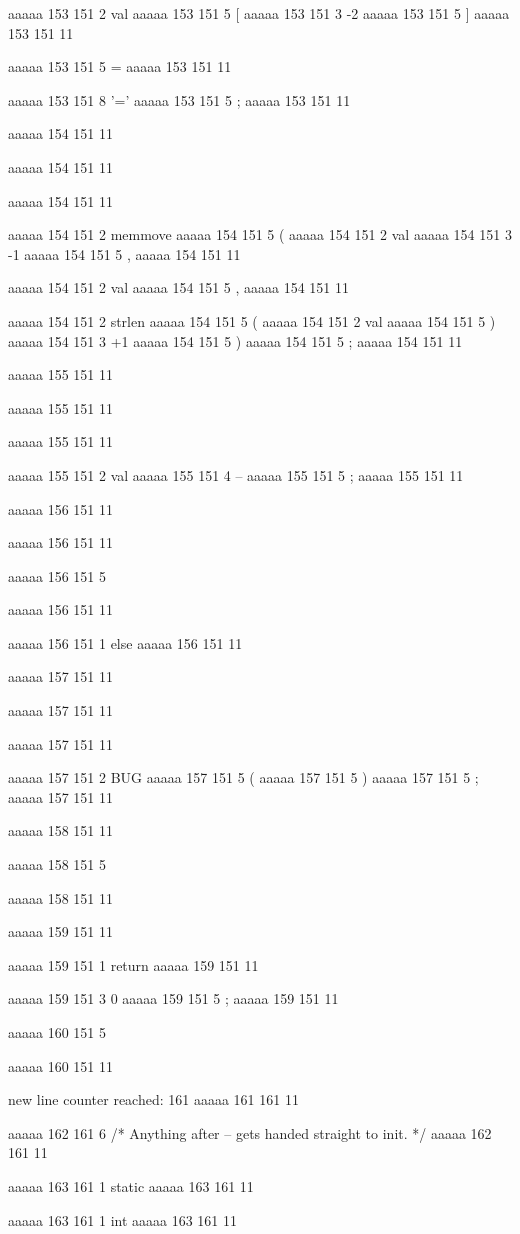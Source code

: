 {{{aaaaa 153 151
2
val
aaaaa 153 151
5
[
aaaaa 153 151
3
-2
aaaaa 153 151
5
]
aaaaa 153 151
11
 
aaaaa 153 151
5
=
aaaaa 153 151
11
 
aaaaa 153 151
8
'='
aaaaa 153 151
5
;
aaaaa 153 151
11


aaaaa 154 151
11
	
aaaaa 154 151
11
	
aaaaa 154 151
11
	
aaaaa 154 151
2
memmove
aaaaa 154 151
5
(
aaaaa 154 151
2
val
aaaaa 154 151
3
-1
aaaaa 154 151
5
,
aaaaa 154 151
11
 
aaaaa 154 151
2
val
aaaaa 154 151
5
,
aaaaa 154 151
11
 
aaaaa 154 151
2
strlen
aaaaa 154 151
5
(
aaaaa 154 151
2
val
aaaaa 154 151
5
)
aaaaa 154 151
3
+1
aaaaa 154 151
5
)
aaaaa 154 151
5
;
aaaaa 154 151
11


aaaaa 155 151
11
	
aaaaa 155 151
11
	
aaaaa 155 151
11
	
aaaaa 155 151
2
val
aaaaa 155 151
4
--
aaaaa 155 151
5
;
aaaaa 155 151
11


aaaaa 156 151
11
	
aaaaa 156 151
11
	
aaaaa 156 151
5
}
aaaaa 156 151
11
 
aaaaa 156 151
1
else
aaaaa 156 151
11


aaaaa 157 151
11
	
aaaaa 157 151
11
	
aaaaa 157 151
11
	
aaaaa 157 151
2
BUG
aaaaa 157 151
5
(
aaaaa 157 151
5
)
aaaaa 157 151
5
;
aaaaa 157 151
11


aaaaa 158 151
11
	
aaaaa 158 151
5
}
aaaaa 158 151
11


aaaaa 159 151
11
	
aaaaa 159 151
1
return
aaaaa 159 151
11
 
aaaaa 159 151
3
0
aaaaa 159 151
5
;
aaaaa 159 151
11


aaaaa 160 151
5
}
aaaaa 160 151
11


new line counter reached: 161
aaaaa 161 161
11


aaaaa 162 161
6
/* Anything after -- gets handed straight to init. */
aaaaa 162 161
11


aaaaa 163 161
1
static
aaaaa 163 161
11
 
aaaaa 163 161
1
int
aaaaa 163 161
11
 
